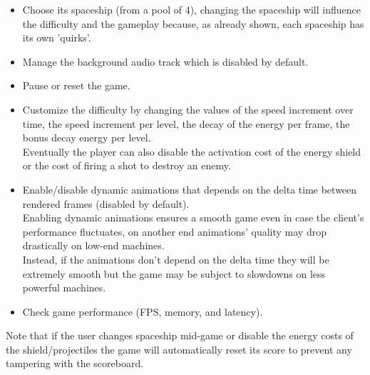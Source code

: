 \documentclass[a4paper,11pt]{article}
\begin{document}
\begin{itemize}
    \item Choose its spaceship (from a pool of 4), changing the spaceship will influence the difficulty and the gameplay because, as already shown, each spaceship has its own 'quirks'.
    \item Manage the background audio track which is disabled by default.
    \item Pause or reset the game.
    \item Customize the difficulty by changing the values of the speed increment over time, the speed increment per level, the decay of the energy per frame, the bonus decay energy per level.\\
    Eventually the player can also disable the activation cost of the energy shield or the cost of firing a shot to destroy an enemy.
    \item Enable/disable dynamic animations that depends on the delta time between rendered frames (disabled by default).\\
        Enabling dynamic animations ensures a smooth game even in case the client's performance fluctuates, on another end animations' quality may drop drastically on low-end machines.\\
        Instead, if the animations don't depend on the delta time they will be extremely smooth but the game may be subject to slowdowns on less powerful machines.
    \item Check game performance (FPS, memory, and latency).
\end{itemize}{}
Note that if the user changes spaceship mid-game or disable the energy costs of the shield/projectiles the game will automatically reset its score to prevent any tampering with the scoreboard.
\newpage
\end{document}
